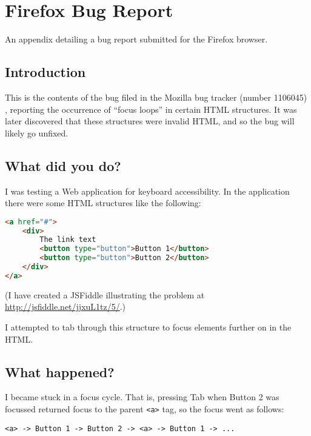 \chapter{Firefox Bug Report} \label{App:Firefox Bug Report}

\begin{preamble}
	An appendix detailing a bug report submitted for the Firefox browser.
\end{preamble}

\section{Introduction}

This is the contents of the bug filed in the Mozilla bug tracker (number 1106045) \citep{FirefoxFocusLoopBug}, reporting the occurrence of ``focus loops'' in certain HTML structures. It was later discovered that these structures were invalid HTML, and so the bug will likely go unfixed.

\section{What did you do?}\label{what-did-you-do}

I was testing a Web application for keyboard accessibility. In the
application there were some HTML structures like the following:

\begin{lstlisting}[language=html]
<a href="#">
    <div>
        The link text
        <button type="button">Button 1</button>
        <button type="button">Button 2</button>
    </div>
</a>
\end{lstlisting}

(I have created a JSFiddle illustrating the problem at
\url{http://jsfiddle.net/jjxuL1tz/5/}.)

I attempted to tab through this structure to focus elements further on
in the HTML.

\section{What happened?}\label{what-happened}

I became stuck in a focus cycle. That is, pressing Tab when Button 2 was
focussed returned focus to the parent
\texttt{\textless{}a\textgreater{}} tag, so the focus went as follows:

\begin{verbatim}
<a> -> Button 1 -> Button 2 -> <a> -> Button 1 -> ...
\end{verbatim}


